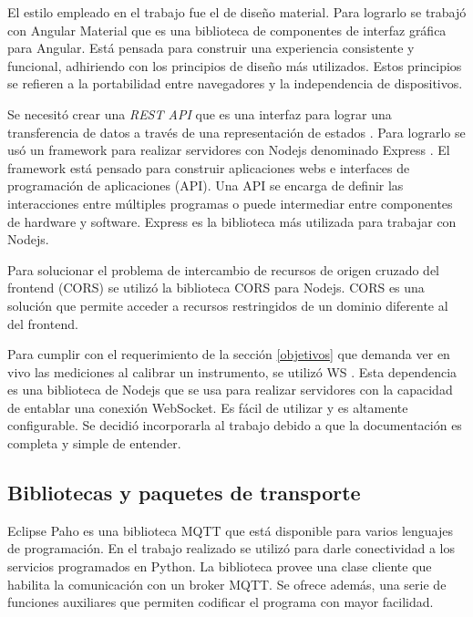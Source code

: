 El estilo empleado en el trabajo fue el de diseño material.
Para lograrlo se trabajó con Angular Material \citep{WEBSITE:AngularMaterialio} que es una biblioteca de componentes de interfaz gráfica para Angular.
Está pensada para construir una experiencia consistente y funcional, adhiriendo con los principios de diseño más utilizados.
Estos principios se refieren a la portabilidad entre navegadores y la independencia de dispositivos.

Se necesitó crear una \emph{REST API} que es una interfaz para lograr una transferencia de datos a través de una representación de estados \citep{zhou2014rest}.
Para lograrlo se usó un framework para realizar servidores con Nodejs denominado Express \citep{WEBSITE:ExpressPage}.
El framework está pensado para construir aplicaciones webs e interfaces de programación de aplicaciones (API).
Una API se encarga de definir las interacciones entre múltiples programas o puede intermediar entre componentes de hardware y software.
Express es la biblioteca más utilizada para trabajar con Nodejs. \citep{WEBSITE:Express}

Para solucionar el problema de intercambio de recursos de origen cruzado del frontend (CORS) \citep{WEBSITE:CORS} se utilizó la biblioteca CORS para Nodejs.
CORS \citep{WEBSITE:CORSjs} es una solución que permite acceder a recursos restringidos de un dominio diferente al del frontend.

Para cumplir con el requerimiento de la sección \ref{objetivos} que demanda ver en vivo las mediciones al calibrar un instrumento, se utilizó WS \citep{WEBSITE:WSjs}. 
Esta dependencia es una biblioteca de Nodejs que se usa para realizar servidores con la capacidad de entablar una conexión WebSocket.
Es fácil de utilizar y es altamente configurable.
Se decidió incorporarla al trabajo debido a que la documentación es completa y simple de entender.

\subsection{Bibliotecas y paquetes de transporte}
Eclipse Paho \citep{WEBSITE:EclipsePaho} es una biblioteca MQTT que está disponible para varios lenguajes de programación.
En el trabajo realizado se utilizó para darle conectividad a los servicios programados en Python.
La biblioteca provee una clase cliente que habilita la comunicación con un broker MQTT.
Se ofrece además, una serie de funciones auxiliares que permiten codificar el programa con mayor facilidad.

